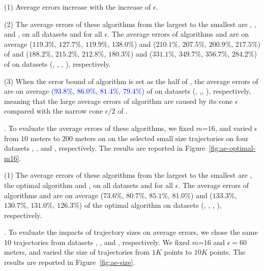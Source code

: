 \ni(1) Average errors increase with the increase of $\epsilon$.

\ni(2) The average errors of these algorithms from the largest to the smallest are \cista, \cist, \dps and \squishe, on all datasets and for all $\epsilon$.
The average errors of algorithms \cist and \cista are on average
($119.3\%$, $127.7\%$, $119.9\%$, $138.0\%$)
and ($210.1\%$, $207.5\%$, $200.9\%$, $217.5\%$)
of \dps and ($188.2\%$, $215.2\%$, $212.8\%$, $180.3\%$) and 
($331.1\%$, $349.7\%$, $356.7\%$, $284.2\%$)
 of \squishe on {datasets} (\sercar, \geolife, \mopsi, \pricar), respectively.

\ni(3) When the error bound of algorithm \cista is set as the half of \cist, the
average errors of \cista are on average \textcolor{blue}{($93.8\%$, $86.0\%$, $81.4\%$, {$79.4\%$})} of \cist on {datasets} (\sercar, \geolife,\mopsi, \pricar), respectively, meaning that the large average errors of algorithm \cista are caused by its cone \wrt $\epsilon$ compared with the narrow cone \wrt $\epsilon/2$ of \cist.

.
To evaluate the average errors of these algorithms, we fixed {$m$=$16$}, and
varied $\epsilon$ from $10$ meters to $200$ meters on on the selected small size trajectories on four datasets \sercar, \geolife, \mopsi and \pricar, respectively.
The results are reported in Figure~\ref{fig:ae-optimal-m16}.

\ni(1) The average errors of these algorithms from the largest to the smallest are \cista, the optimal algorithm and \cist, on all datasets and for all $\epsilon$.
The average errors of algorithms \cist and \cista are on average
($73.6\%$, $80.7\%$, $85.1\%$, $81.0\%$)
and ($133.3\%$, $130.7\%$, $131.0\%$, $126.3\%$)
of the optimal algorithm on {datasets} (\sercar, \geolife, \mopsi, \pricar), respectively.

.
To evaluate the impacts of trajectory sizes on average errors, we chose the same
{$10$} trajectories from  {datasets}  \sercar, \geolife, \mopsi and \pricar, respectively.
We fixed {$m$=$16$} and $\epsilon = 60$ meters, and varied the size  of trajectories from $1K$ points to $10K$ points.
%
The results are reported in Figure~\ref{fig:ae-size}.


